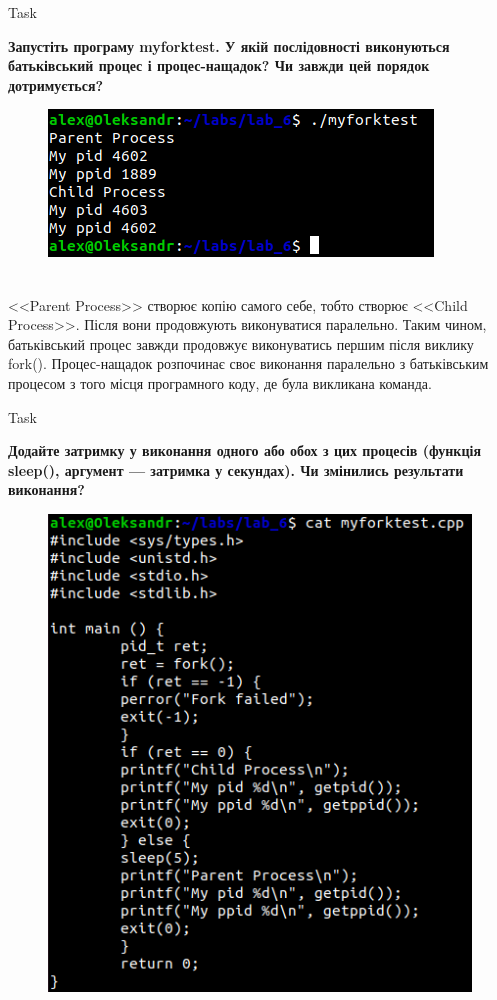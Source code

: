 \documentclass[a4paper,12pt]{article}
\newcommand{\RomanNumeralCaps}[1]{\MakeUppercase{\romannumeral #1}}
\begin{document}
\newpage
    \begin{center}
        \Large{Task \RomanNumeralCaps{3}}
    \end{center}
    \textbf{Запустіть програму myforktest. У якій послідовності виконуються батьківський процес і процес-нащадок? Чи
    завжди цей порядок дотримується?}
    \begin{figure}[h!]
        \begin{minipage}[h]{1\linewidth}
            \centering
            \includegraphics[width=0.6\linewidth]{Prt sc/Figure_3.png}  
        \end{minipage}
    \end{figure} \\
    <<Parent Process>> створює копію самого себе, тобто створює <<Child Process>>. Після вони продовжують виконуватися паралельно.
    Таким чином, батьківський процес завжди продовжує виконуватись першим після виклику fork(). 
    Процес-нащадок розпочинає своє виконання паралельно з батьківським процесом з того місця програмного коду, де була викликана команда.
    \begin{center}
        \Large{Task \RomanNumeralCaps{4}}
    \end{center}
    \textbf{Додайте затримку у виконання одного або обох з цих процесів (функція sleep(), аргумент — затримка у
    секундах). Чи змінились результати виконання?}
    \begin{figure}[h!]
        \begin{minipage}[h]{1\linewidth}
            \centering
            \includegraphics[width=0.6\linewidth]{Prt sc/Figure_4_1.png}  
        \end{minipage}
    \end{figure}
\end{document}
